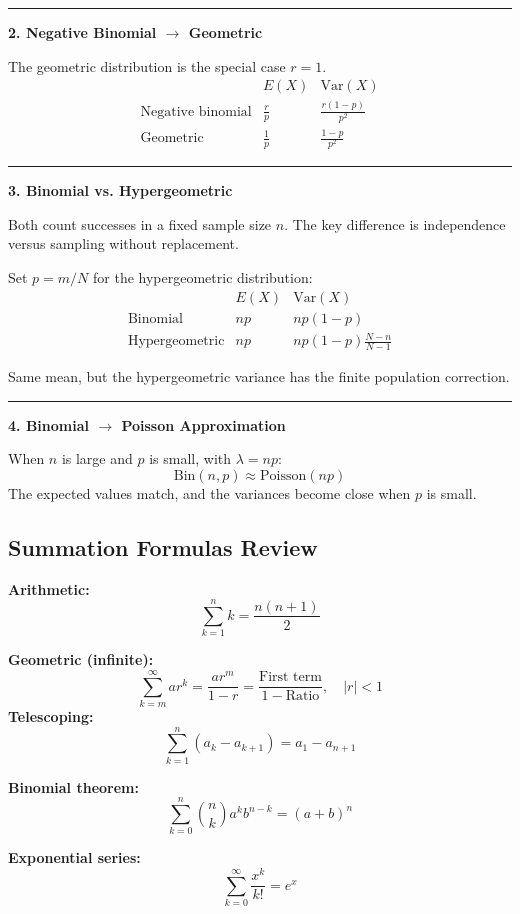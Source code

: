 ﻿\documentclass[12pt]{article}
\begin{document}
\medskip
\hrule
\medskip

\textbf{2. Negative Binomial $\rightarrow$ Geometric}

The geometric distribution is the special case $r=1$.
\[
\begin{array}{r|cc}
& E(X) & \mathrm{Var}(X) \\ \hline
\text{Negative binomial} &
\displaystyle\frac{r}{p} &
\displaystyle\frac{r(1-p)}{p^2} \\[8pt]
\text{Geometric} &
\displaystyle\frac{1}{p} &
\displaystyle\frac{1-p}{p^2}
\end{array}
\]

\medskip
\hrule
\medskip

\textbf{3. Binomial vs. Hypergeometric}

Both count successes in a fixed sample size $n$.
The key difference is independence versus sampling
without replacement.

Set $p=m/N$ for the hypergeometric distribution:
\[
\begin{array}{r|cc}
& E(X) & \mathrm{Var}(X) \\ \hline
\text{Binomial} &
np &
np(1-p) \\[6pt]
\text{Hypergeometric} &
np &
\displaystyle np(1-p)\frac{N-n}{N-1}
\end{array}
\]

Same mean, but the hypergeometric variance has the
finite population correction.

\medskip
\hrule
\medskip

\textbf{4. Binomial $\rightarrow$ Poisson Approximation}

When $n$ is large and $p$ is small, with $\lambda=np$:
\[
\boxed{\mathrm{Bin}(n,p)\approx\mathrm{Poisson}(np)}
\]
The expected values match, and the variances become
close when $p$ is small.
\subsection*{{Summation Formulas Review}}

\textbf{Arithmetic:}
\[
\sum_{k=1}^{n}k=\frac{n(n+1)}{2}
\]

\textbf{Geometric (infinite):}
\[
\sum_{k=m}^{\infty}ar^k
=\frac{ar^m}{1-r}
=\frac{\text{First term}}{1-\text{Ratio}}
,\quad |r|<1
\]
\textbf{Telescoping:}
\[
\sum_{k=1}^{n}(a_k-a_{k+1})=a_1-a_{n+1}
\]

\textbf{Binomial theorem:}
\[
\sum_{k=0}^{n}\binom{n}{k}a^kb^{n-k}=(a+b)^n
\]

\textbf{Exponential series:}
\[
\sum_{k=0}^{\infty}\frac{x^k}{k!}=e^x
\]
\end{document}
